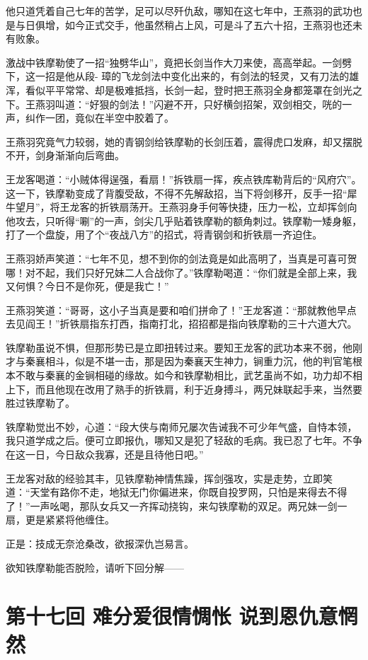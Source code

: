 \documentclass[12pt,oneside]{book}
\begin{document}
他只道凭着自己七年的苦学，足可以尽歼仇敌，哪知在这七年中，王燕羽的武功也是与日俱增，如今正式交手，他虽然稍占上风，可是斗了五六十招，王燕羽也还未有败象。

激战中铁摩勒使了一招``独劈华山''，竟把长剑当作大刀来使，高高举起。一剑劈下，这一招是他从段-
璋的飞龙剑法中变化出来的，有剑法的轻灵，又有刀法的雄浑，看似平平常常、却是极难抵挡，长剑一起，登时把王燕羽全身都笼罩在剑光之下。王燕羽叫道：``好狠的剑法！''闪避不开，只好横剑招架，双剑相交，咣的一声，纠作一团，竟似在半空中胶着了。

王燕羽究竟气力较弱，她的青钢剑给铁摩勒的长剑压着，震得虎口发麻，却又摆脱不开，剑身渐渐向后弯曲。

王龙客喝道：``小贼体得逞强，看扇！''拆铁扇一挥，疾点铁库勒背后的``风府穴''。这一下，铁摩勒变成了背腹受敌，不得不先解敌招，当下将剑移开，反手一招``犀牛望月''，将王龙客的折铁扇荡开。王燕羽身手何等快捷，压力一松，立却挥剑向他攻去，只听得``唰''的一声，剑尖几乎贴着铁摩勒的额角刺过。铁摩勒一矮身躯，打了一个盘旋，用了个``夜战八方''的招式，将青钢剑和折铁扇一齐迫住。

王燕羽娇声笑道：``七年不见，想不到你的剑法竟是如此高明了，当真是可喜可贺哪！对不起，我们只好兄妹二人合战你了。''铁摩勒喝道：``你们就是全部上来，我又何惧？今日不是你死，便是我亡！''

王燕羽笑道：``哥哥，这小子当真是要和咱们拼命了！''王龙客道：``那就教他早点去见阎王！''折铁扇指东打西，指南打北，招招都是指向铁摩勒的三十六道大穴。

铁摩勒虽说不惧，但那形势已是立即扭转过来。要知王龙客的武功本来不弱，他刚才与秦襄相斗，似是不堪一击，那是因为秦襄天生神力，锏重力沉，他的判官笔根本不敢与秦襄的金锏相碰的缘故。如今和铁摩勒相比，武艺虽尚不如，功力却不相上下，而且他现在改用了熟手的折铁肩，利于近身搏斗，两兄妹联起手来，当然要胜过铁摩勒了。

铁摩勒觉出不妙，心道：``段大侠与南师兄屡次告诫我不可少年气盛，自恃本领，我只道学成之后。便可立即报仇，哪知又是犯了轻敌的毛病。我已忍了七年。不争在这一日，今日敌众我寡，还是且待他日吧。''

王龙客对敌的经验其丰，见铁摩勒神情焦躁，挥剑强攻，实是走势，立即笑道：``天堂有路你不走，地狱无门你偏进来，你既自投罗网，只怕是来得去不得了！''一声吆喝，那队女兵又一齐挥动挠钩，来勾铁摩勒的双足。两兄妹一剑一扇，更是紧紧将他缠住。

正是：技成无奈沧桑改，欲报深仇岂易言。

欲知铁摩勒能否脱险，请听下回分解------

\chapter{第十七回 难分爱很情惆怅
说到恩仇意惘然}\label{ux7b2cux5341ux4e03ux56de-ux96beux5206ux7231ux5f88ux60c5ux60c6ux6005-ux8bf4ux5230ux6069ux4ec7ux610fux60d8ux7136}
\end{document}
